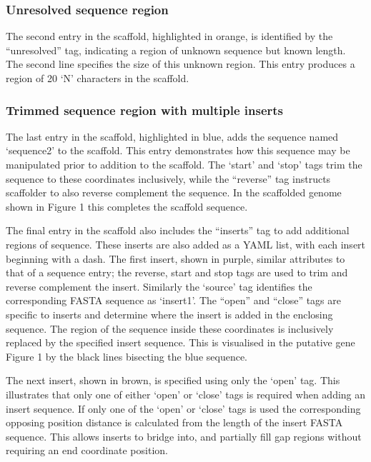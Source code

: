 \documentclass[10pt]{bmc_article}
\newenvironment{bmcformat}{\begin{raggedright}\baselineskip20pt\sloppy\setboolean{publ}{false}}{\end{raggedright}\baselineskip20pt\sloppy}
\begin{document}
\begin{bmcformat}
\subsubsection*{Unresolved sequence region} %

The second entry in the scaffold, highlighted in orange, is identified by the
``unresolved'' tag, indicating a region of unknown sequence but known length.
The second line specifies the size of this unknown region. This entry produces
a region of 20 `N' characters in the scaffold. \pb

\subsubsection*{Trimmed sequence region with multiple inserts} %

The last entry in the scaffold, highlighted in blue, adds the sequence named
`sequence2' to the scaffold. This entry demonstrates how this sequence may be
manipulated prior to addition to the scaffold. The `start' and `stop' tags trim
the sequence to these coordinates inclusively, while the ``reverse'' tag
instructs scaffolder to also reverse complement the sequence. In the scaffolded
genome shown in Figure 1 this completes the scaffold sequence. \pb

The final entry in the scaffold also includes the ``inserts'' tag to add
additional regions of sequence. These inserts are also added as a YAML list,
with each insert beginning with a dash. The first insert, shown in purple,
similar attributes to that of a sequence entry; the reverse, start and stop
tags are used to trim and reverse complement the insert. Similarly the `source'
tag identifies the corresponding FASTA sequence as `insert1'. The ``open'' and
``close'' tags are specific to inserts and determine where the insert is added
in the enclosing sequence. The region of the sequence inside these coordinates
is inclusively replaced by the specified insert sequence. This is visualised in
the putative gene Figure 1 by the black lines bisecting the blue sequence. \pb

The next insert, shown in brown, is specified using only the `open' tag. This
illustrates that only one of either `open' or `close' tags is required when
adding an insert sequence. If only one of the `open' or `close' tags is used
the corresponding opposing position distance is calculated from the length of
the insert FASTA sequence. This allows inserts to bridge into, and partially
fill gap regions without requiring an end coordinate position. \pb


\end{bmcformat}
\end{document}
